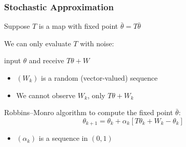 \documentclass[xcolor=dvipsnames]{beamer}  %
\newcommand{\1}{\mathbbm 1}
\begin{document}
\begin{frame}

    \begin{figure}
        \centering
    \end{figure}
    
\end{frame}

\begin{frame}
    \frametitle{Stochastic Approximation}

    Suppose $T$ is a map with fixed point $\bar \theta = T \bar \theta$

    We can only evaluate $T$ with noise:
    \begin{center}
        input $\theta$ and receive $T \theta + W$ 
    \end{center}

    \begin{itemize}
        \item $(W_k)$ is a random (vector-valued) sequence 
        \item We cannot observe $W_k$, only $T \theta + W_k$
    \end{itemize}

    Robbins--Monro algorithm to compute the fixed point $\bar \theta$:
    \begin{equation*}
        \theta_{k+1} 
        = \theta_k + \alpha_k [ T \theta_k + W_k - \theta_k ]
    \end{equation*}

    \begin{itemize}
        \item $(\alpha_k)$ is a sequence in $(0,1)$
    \end{itemize}

\end{frame}
\end{document}
